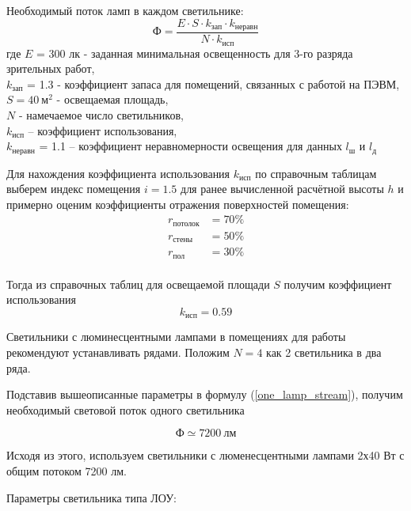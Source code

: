 Необходимый поток ламп в каждом светильнике:
\begin{equation}
\label{one_lamp_stream}
    \text{Ф} = \frac{E \cdot S \cdot k_\text{зап} \cdot k_\text{неравн}}{N \cdot k_\text{исп}}
\end{equation}
где $E$ = 300 лк - заданная минимальная освещенность для 3-го разряда зрительных работ, \\
$k_\text{зап}$ = 1.3 - коэффициент запаса для помещений, связанных с работой на ПЭВМ,   \\
$S = 40 ~\text{м}^2$ - освещаемая площадь,                                              \\
$N$ - намечаемое число светильников,                                                    \\
$k_\text{исп}$ – коэффициент использования,                                             \\
$k_\text{неравн}$ = 1.1 – коэффициент неравномерности освещения для данных $l_\text{ш}$ и
$l_\text{д}$

Для нахождения коэффициента использования $k_\text{исп}$ по справочным таблицам
выберем индекс помещения $i = 1.5$ для ранее вычисленной расчётной высоты $h$ и
примерно оценим коэффициенты отражения поверхностей помещения:
\begin{equation}
    \begin{array}{ll}
        r_\text{потолок}    & = 70\% \\
        r_\text{стены}      & = 50\% \\
        r_\text{пол}        & = 30\% \\
    \end{array}
    \label{reflection_coeff}
\end{equation}

Тогда из справочных таблиц для освещаемой площади $S$ получим коэффициент использования
$$
    k_\text{исп} = 0.59
$$

Светильники с люминесцентными лампами в помещениях для работы рекомендуют
устанавливать рядами. Положим $N = 4$ как 2 светильника в два ряда.

Подставив вышеописанные параметры в формулу (\ref{one_lamp_stream}), получим
необходимый световой поток одного светильника

$$
    \text{Ф} \simeq 7200 ~\text{лм}
$$

Исходя из этого, используем светильники с люменесцентными лампами 2х40 Вт с
общим потоком 7200 лм.

Параметры светильника типа ЛОУ:

